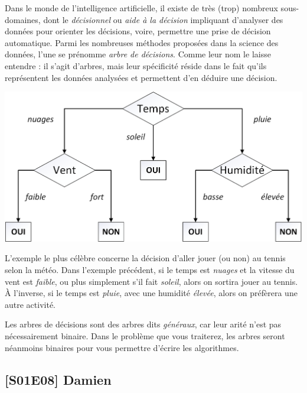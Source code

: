\documentclass[11pt,a4paper]{article}
\begin{document}
\noindent Dans le monde de l'intelligence artificielle, il existe de très (trop) nombreux sous-domaines, dont le \textit{décisionnel} ou \textit{aide à la décision} impliquant d'analyser des données pour orienter les décisions, voire, permettre une prise de décision automatique.
Parmi les nombreuses méthodes proposées dans la science des données, l'une se prénomme \textit{arbre de décisions}.
Comme leur nom le laisse entendre : il s'agit d'arbres, mais leur spécificité réside dans le fait qu'ils représentent les données analysées et permettent d'en déduire une décision.

\bigskip

\begin{center}
\includegraphics[scale=0.70]{img/DecisionTree_Tennis_example.png}
\end{center}

\bigskip

\noindent L'exemple le plus célèbre concerne la décision d'aller jouer (ou non) au tennis selon la météo.
Dans l'exemple précédent, si le temps est \textit{nuages} et la vitesse du vent est \textit{faible}, ou plus simplement s'il fait \textit{soleil}, alors on sortira jouer au tennis.
À l'inverse, si le temps est \textit{pluie}, avec une humidité \textit{élevée}, alors on préfèrera une autre activité.

\medskip

\noindent Les arbres de décisions sont des arbres dits \textit{généraux}, car leur arité n'est pas nécessairement binaire.
Dans le problème que vous traiterez, les arbres seront néanmoins binaires pour vous permettre d'écrire les algorithmes.

\vfillLast

\clearpage


\subsection*{[S01E08] Damien}
\end{document}
